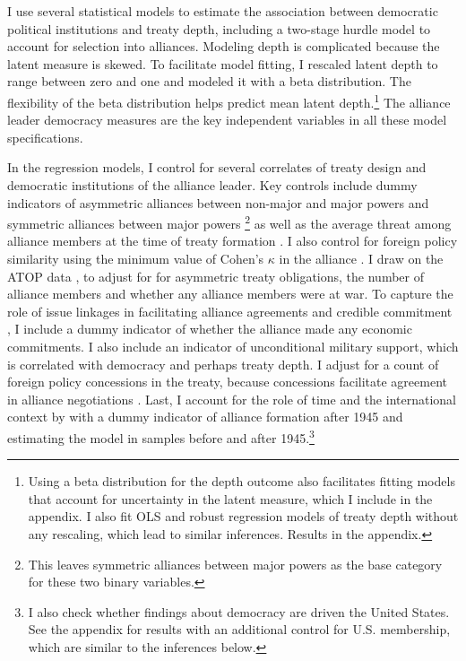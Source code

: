 \documentclass[12pt]{article}
\begin{document}
I use several statistical models to estimate the association between democratic political institutions and treaty depth, including a two-stage hurdle model to account for selection into alliances. 
Modeling depth is complicated because the latent measure is skewed.
To facilitate model fitting, I rescaled latent depth to range between zero and one and modeled it with a beta distribution.
The flexibility of the beta distribution helps predict mean latent depth.\footnote{Using a beta distribution for the depth outcome also facilitates fitting models that account for uncertainty in the latent measure, which I include in the appendix. I also fit OLS and robust regression models of treaty depth without any rescaling, which lead to similar inferences. Results in the appendix.} 
The alliance leader democracy measures are the key independent variables in all these model specifications. 


In the regression models, I control for several correlates of treaty design and democratic institutions of the alliance leader. 
Key controls include dummy indicators of asymmetric alliances between non-major and major powers and symmetric alliances between major powers \citep{Mattes2012}\footnote{This leaves symmetric alliances between major powers as the base category for these two binary variables.} as well as the average threat among alliance members at the time of treaty formation \citep{LeedsSavun2007}. 
I also control for foreign policy similarity using the minimum value of Cohen's $\kappa$ in the alliance \citep{Hage2011}.
I draw on the ATOP data \citep{Leedsetal2002}, to adjust for for asymmetric treaty obligations, the number of alliance members and whether any alliance members were at war. 
To capture the role of issue linkages in facilitating alliance agreements and credible commitment \citep{Poast2012, Poast2013}, I include a dummy indicator of whether the alliance made any economic commitments. 
I also include an indicator of unconditional military support, which is correlated with democracy \citep{Chibaetal2015} and perhaps treaty depth. 
I adjust for a count of foreign policy concessions in the treaty, because concessions facilitate agreement in alliance negotiations \citep{Johnson2015}. 
Last, I account for the role of time and the international context by with a dummy indicator of alliance formation after 1945 and estimating the model in samples before and after 1945.\footnote{I also check whether findings about democracy are driven the United States. See the appendix for results with an additional control for U.S. membership, which are similar to the inferences below.}
\end{document}
